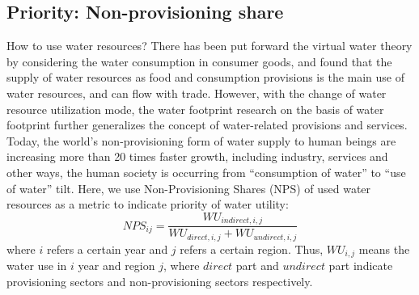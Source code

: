 \documentclass[9pt,twoside,lineno]{pnas-new}
\begin{document}
\subsection*{Priority: Non-provisioning share}
    How to use water resources? There has been put forward the virtual water theory by considering the water consumption in consumer goods, and found that the supply of water resources as food and consumption provisions is the main use of water resources, and can flow with trade. However, with the change of water resource utilization mode, the water footprint research on the basis of water footprint further generalizes the concept of water-related provisions and services. Today, the world's non-provisioning form of water supply to human beings are increasing more than 20 times faster growth, including industry, services and other ways, the human society is occurring from ``consumption of water'' to ``use of water'' tilt.
    Here, we use Non-Provisioning Shares (NPS) of used water resources as a metric to indicate priority of water utility:
    $$ NPS_{ij} = \frac{WU_{indirect, i, j}}{WU_{direct, i, j} + WU_{undirect, i, j}} $$
    where $i$ refers a certain year and $j$ refers a certain region. Thus, $WU_{i,j}$ means the water use in $i$ year and region $j$, where $direct$ part and $undirect$ part indicate provisioning sectors and non-provisioning sectors respectively.
\end{document}
